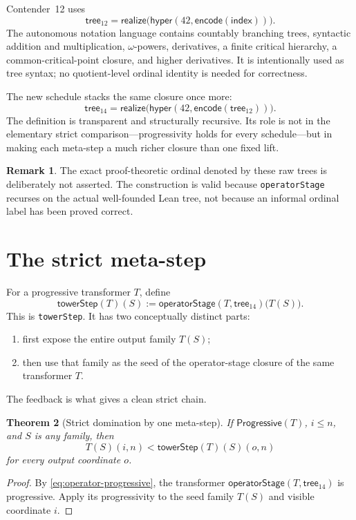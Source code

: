 \documentclass[11pt]{article}
\newtheorem{theorem}{Theorem}[section]
\theoremstyle{definition}
\newtheorem{remark}[theorem]{Remark}
\newcommand{\Prog}{\ensuremath{\mathsf{Progressive}}}
\newcommand{\lean}[1]{\texttt{#1}}
\newcommand{\opstage}{\ensuremath{\mathsf{operatorStage}}}
\newcommand{\step}{\ensuremath{\mathsf{towerStep}}}
\begin{document}
Contender~12 uses
\[
  \mathsf{tree}_{12}
  =\mathsf{realize}\bigl(\mathsf{hyper}(42,
       \mathsf{encode}(\mathsf{index}))\bigr).
\]
The autonomous notation language contains countably branching trees,
syntactic addition and multiplication, $\omega$-powers, derivatives, a
finite critical hierarchy, a common-critical-point closure, and higher
derivatives.  It is intentionally used as tree syntax; no quotient-level
ordinal identity is needed for correctness.

The new schedule stacks the same closure once more:
\[
  \mathsf{tree}_{14}
  =\mathsf{realize}\bigl(\mathsf{hyper}(42,
       \mathsf{encode}(\mathsf{tree}_{12}))\bigr).
\]
The definition is transparent and structurally recursive.  Its role is not in
the elementary strict comparison---progressivity holds for every schedule---but
in making each meta-step a much richer closure than one fixed lift.

\begin{remark}
The exact proof-theoretic ordinal denoted by these raw trees is deliberately not
asserted.  The construction is valid because \lean{operatorStage} recurses on
the actual well-founded Lean tree, not because an informal ordinal label has
been proved correct.
\end{remark}

\section{The strict meta-step}

For a progressive transformer $T$, define
\begin{equation}
  \step(T)(S)
    := \opstage(T,\mathsf{tree}_{14})\bigl(T(S)\bigr).
\label{eq:tower-step}
\end{equation}
This is \lean{towerStep}.  It has two conceptually distinct parts:
\begin{enumerate}[label=(\alph*)]
  \item first expose the entire output family $T(S)$;
  \item then use that family as the seed of the operator-stage closure of the
        same transformer $T$.
\end{enumerate}
The feedback is what gives a clean strict chain.

\begin{theorem}[Strict domination by one meta-step]
If \(\Prog(T)\), $i\le n$, and $S$ is any family, then
\[
  T(S)(i,n)<\step(T)(S)(o,n)
\]
for every output coordinate $o$.
\end{theorem}
\begin{proof}
By \cref{eq:operator-progressive}, the transformer
$\opstage(T,\mathsf{tree}_{14})$ is progressive.  Apply its progressivity to
the seed family $T(S)$ and visible coordinate $i$.
\end{proof}
\end{document}
